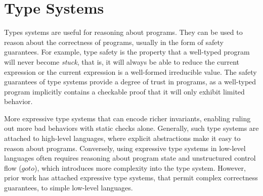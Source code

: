 \section{Type Systems}
Types systems are useful for reasoning about programs.
They can be used to reason about the correctness of programs, usually in the form of safety guarantees.
For example, type safety is the property that a well-typed program will never become \emph{stuck}, that is, it will always be able to reduce the current expression or the current expression is a well-formed irreducible value.
The safety guarantees of type systems provide a degree of trust in programs, as a well-typed program implicitly contains a checkable proof that it will only exhibit limited behavior.

More expressive type systems that can encode richer invariants, enabling ruling out more bad behaviors with static checks alone.
Generally, such type systems are attached to high-level languages, where explicit abstractions make it easy to reason about programs.
Conversely, using expressive type systems in low-level languages often requires reasoning about program state and unstructured control flow (\ie $goto$), which introduces more complexity into the type system.
However, prior work has attached expressive type systems, that permit complex correctness guarantees, to simple low-level languages.



